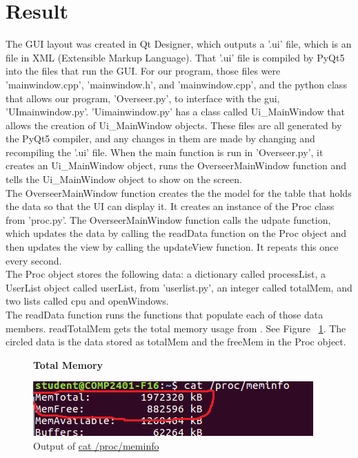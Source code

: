 \documentclass[12pt]{article}
\begin{document}
	
\section{Result}

The GUI layout was created in Qt Designer, which outputs a '.ui' file, which is an file in XML (Extensible Markup Language).
That '.ui' file is compiled by PyQt5 into the files that run the GUI.
For our program, those files were 'mainwindow.cpp', 'mainwindow.h', and 'mainwindow.cpp', and the python class that allows our program, 'Overseer.py', to interface with the gui, 'UImainwindow.py'.
'Uimainwindow.py' has a class called Ui\_MainWindow that allows the creation of Ui\_MainWindow objects.
These files are all generated by the PyQt5 compiler, and any changes in them are made by changing and recompiling the '.ui' file.
When the main function is run in 'Overseer.py', it creates an Ui\_MainWindow object, runs the OverseerMainWindow function and tells the Ui\_MainWindow object to show on the screen.\\
The OverseerMainWindow function creates the the model for the table that holds the data so that the UI can display it.
It creates an instance of the Proc class from 'proc.py'.
The OverseerMainWindow function calls the udpate function, which updates the data by calling the readData function on the Proc object and then updates the view by calling the updateView function.
It repeats this once every second.\\
The Proc object stores the following data: a dictionary called processList, a UserList object called userList, from 'userlist.py', an integer called totalMem, and two lists called cpu and openWindows.\\
The readData function runs the functions that populate each of those data members.
readTotalMem gets the total memory usage from .
See Figure ~\ref{figTotalMem}.
The circled data is the data stored as totalMem and the freeMem in the Proc object.
\begin{figure}[h]
	\centering
	\textbf{Total Memory}\par\medskip
	\includegraphics{totalMem}
	\caption{Output of \url{cat /proc/meminfo}}
	\label{figTotalMem}
\end{figure}
\end{document}
